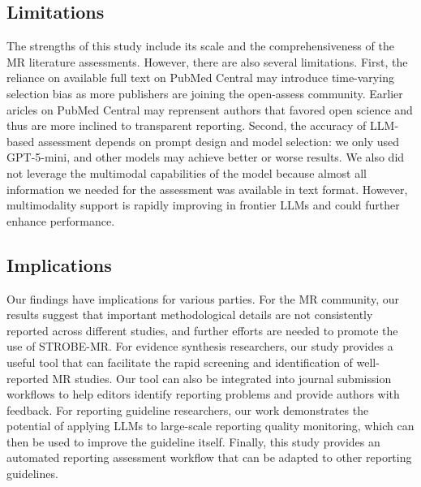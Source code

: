 \subsection{Limitations}
 

The strengths of this study include its scale and the comprehensiveness of the MR literature assessments. However, there are also several limitations. First, the reliance on available full text on PubMed Central may introduce time-varying selection bias as more publishers are joining the open-assess community. Earlier aricles on PubMed Central may reprensent authors that favored open science and thus are more inclined to transparent reporting. Second, the accuracy of LLM-based assessment depends on prompt design and model selection: we only used GPT-5-mini, and other models may achieve better or worse results. We also did not leverage the multimodal capabilities of the model because almost all information we needed for the assessment was available in text format. However, multimodality support is rapidly improving in frontier LLMs and could further enhance performance.

\subsection{Implications}
Our findings have implications for various parties. For the MR community, our results suggest that important methodological details are not consistently reported across different studies, and further efforts are needed to promote the use of STROBE-MR. For evidence synthesis researchers, our study provides a useful tool that can facilitate the rapid screening and identification of well-reported MR studies. Our tool can also be integrated into journal submission workflows to help editors identify reporting problems and provide authors with feedback. For reporting guideline researchers, our work demonstrates the potential of applying LLMs to large-scale reporting quality monitoring, which can then be used to improve the guideline itself. Finally, this study provides an automated reporting assessment workflow that can be adapted to other reporting guidelines.